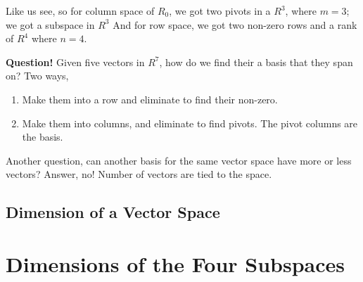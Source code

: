 Like us see, so for column space of \(R_0\), we got two pivots in a \(R^3\), where \(m = 3\); we got a subspace in \(R^3\)  And for row space, we got two non-zero rows and a rank of \(R^4\) where \(n = 4\). 

\textbf{Question!} Given five vectors in \(R^7\), how do we find their a basis that they span on? 
Two ways,
\begin{enumerate}
    \item Make them into a row and eliminate to find their non-zero. 
    \item Make them into columns, and eliminate to find pivots. The pivot columns are the basis. 
\end{enumerate}  

Another question, can another basis for the same vector space have more or less vectors? Answer, no! Number of vectors are tied to the space. 

\subsection{Dimension of a Vector Space}


\section{Dimensions of the Four Subspaces}

